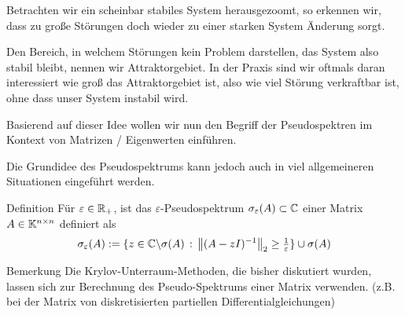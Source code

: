 Betrachten wir ein scheinbar stabiles System herausgezoomt, so erkennen wir, dass zu große Störungen doch wieder zu 
einer starken System Änderung sorgt.

\begin{center}
  
\end{center}

Den Bereich, in welchem Störungen kein Problem darstellen, das System also stabil bleibt, nennen wir Attraktorgebiet.
In der Praxis sind wir oftmals daran interessiert wie groß das Attraktorgebiet ist, also wie viel Störung verkraftbar 
ist, ohne dass unser System instabil wird.

Basierend auf dieser Idee wollen wir nun den Begriff der Pseudospektren im Kontext von Matrizen / Eigenwerten einführen.

Die Grundidee des Pseudospektrums kann jedoch auch in viel allgemeineren Situationen eingeführt werden. 




\begin{colbox}{Definition}
  Für $\varepsilon\in\mathbb R_+$, ist das $\varepsilon$-Pseudospektrum $\sigma_\varepsilon(A)\subset\mathbb C  $ 
  einer Matrix $A\in\mathbb K^{n\times n}$ definiert als 
  \begin{align*}
    \sigma_\varepsilon(A) := \{z\in\C\backslash\sigma(A)\,:\, \vertn{2}{(A-zI)^{-1}}_2\geq \tfrac{1}{\varepsilon}\} 
    \cup \sigma(A)
  \end{align*}
\end{colbox}

\begin{colbox}{Bemerkung}
  Die Krylov-Unterraum-Methoden, die bisher diskutiert wurden, lassen sich zur Berechnung des Pseudo-Spektrums einer 
  Matrix verwenden. (z.B. bei der Matrix von diskretisierten partiellen Differentialgleichungen)
\end{colbox}

